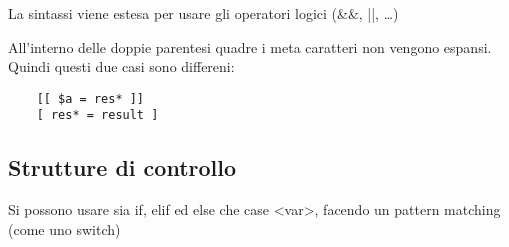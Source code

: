 \documentclass
[10pt,        %
 a4paper,     %
 onecolumn,   %
 fleqn,       %
 oneside,     %
 notitlepage, %
 openany      %
]{article}    %
\begin{document}
La sintassi viene estesa per usare gli operatori logici (\&\&, ||, \ldots)

All'interno delle doppie parentesi quadre i meta caratteri non vengono espansi. Quindi questi due casi sono differeni:
\begin{lstlisting}
    [[ $a = res* ]]
    [ res* = result ]
\end{lstlisting}

\subsection{Strutture di controllo}
Si possono usare sia if, elif ed else che case <var>, facendo un pattern matching (come uno switch)
\end{document}
